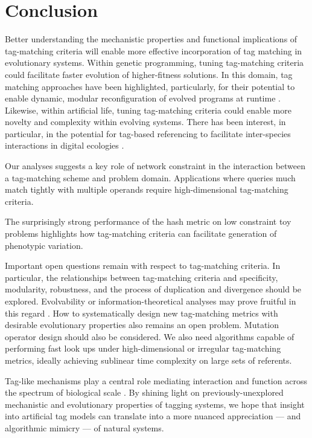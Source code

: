 \section{Conclusion}

Better understanding the mechanistic properties and functional implications of tag-matching criteria will enable more effective incorporation of tag matching in evolutionary systems.
Within genetic programming, tuning tag-matching criteria could facilitate faster evolution of higher-fitness solutions.
In this domain, tag matching approaches have been highlighted, particularly, for their potential to enable dynamic, modular reconfiguration of evolved programs at runtime \citep{spector2011tag,lalejini2021tag}.
Likewise, within artificial life, tuning tag-matching criteria could enable more novelty and complexity within evolving systems.
There has been interest, in particular, in the potential for tag-based referencing to facilitate inter-species interactions in digital ecologies \citep{dolson2021review}.

Our analyses suggests a key role of network constraint in the interaction between a tag-matching scheme and problem domain.
Applications where queries much match tightly with multiple operands require high-dimensional tag-matching criteria.

The surprisingly strong performance of the hash metric on low constraint toy problems highlights how tag-matching criteria can facilitate generation of phenotypic variation.

Important open questions remain with respect to tag-matching criteria.
In particular, the relationships between tag-matching criteria and specificity, modularity, robustness, and the process of duplication and divergence should be explored.
Evolvability or information-theoretical analyses may prove fruitful in this regard \citep{tarapore2015evolvability}.
How to systematically design new tag-matching metrics with desirable evolutionary properties also remains an open problem.
Mutation operator design should also be considered.
We also need algorithms capable of performing fast look ups under high-dimensional or irregular tag-matching metrics, ideally achieving sublinear time complexity on large sets of referents.

Tag-like mechanisms play a central role mediating interaction and function across the spectrum of biological scale \citep{holland2012signals}.
By shining light on previously-unexplored mechanistic and evolutionary properties of tagging systems, we hope that insight into artificial tag models can translate into a more nuanced appreciation --- and algorithmic mimicry --- of natural systems.
